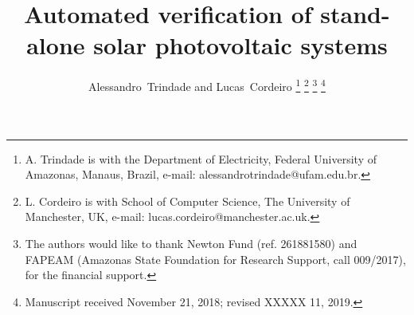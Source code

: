 \documentclass[journal]{IEEEtran}
\begin{document}
%
\title{Automated verification of stand-alone solar photovoltaic systems}
%
%
%

\author{Alessandro~Trindade and Lucas~Cordeiro%
\thanks{A. Trindade is with the Department of Electricity, Federal University of Amazonas, Manaus, Brazil, e-mail: alessandrotrindade@ufam.edu.br.}%
\thanks{L. Cordeiro is with School of Computer Science, The University of Manchester, UK, e-mail: lucas.cordeiro@manchester.ac.uk.}%
\thanks{The authors would like to thank Newton Fund (ref. 261881580) and FAPEAM (Amazonas State Foundation for Research Support, call 009/2017), for the financial support.}
\thanks{Manuscript received November 21, 2018; revised XXXXX 11, 2019.}}

% 
%
\end{document}
